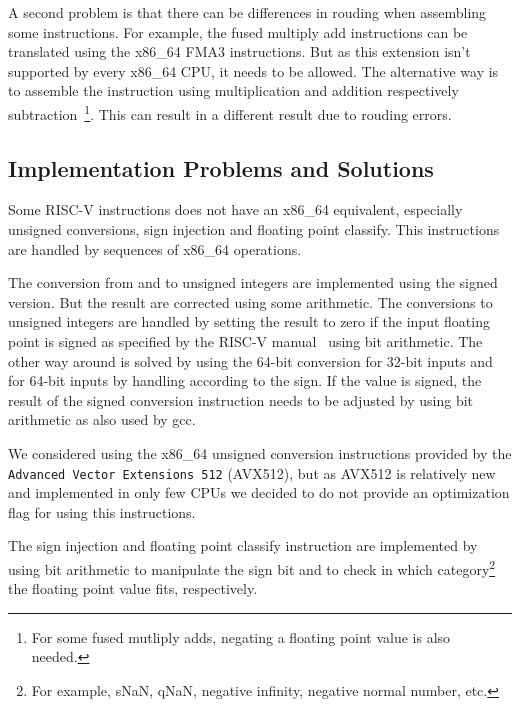 \documentclass[course=eragp]{aspdoc}
\begin{document}
\par


A second problem is that there can be differences in rouding when assembling some instructions. For
example, the fused multiply add instructions can be translated using the x86\_64 FMA3 instructions.
But as this extension isn't supported by every x86\_64 CPU, it needs to be allowed. The alternative
way is to assemble the instruction using multiplication and addition respectively
subtraction~\footnote{For some fused mutliply adds, negating a floating point value is also
    needed.}. This can result in a different result due to rouding errors.


\subsection{Implementation Problems and Solutions}

Some RISC-V instructions does not have an x86\_64 equivalent, especially unsigned conversions, sign
injection and floating point classify. This instructions are handled by sequences of x86\_64
operations.

\par

The conversion from and to unsigned integers are implemented using the signed version. But the
result are corrected using some arithmetic. The conversions to unsigned integers are handled by
setting the result to zero if the input floating point is signed as specified by the RISC-V
manual~\cite{rvspec} using bit arithmetic. The other way around is solved by using the 64-bit
conversion for 32-bit inputs and for 64-bit inputs by handling according to the sign. If the value is
signed, the result of the signed conversion instruction needs to be adjusted by using bit arithmetic
as also used by gcc.

\par

We considered using the x86\_64 unsigned conversion instructions provided by the \texttt{Advanced
    Vector Extensions 512} (AVX512), but as AVX512 is relatively new and implemented in only few CPUs we
decided to do not provide an optimization flag for using this instructions.

\par

The sign injection and floating point classify instruction are implemented by using bit arithmetic
to manipulate the sign bit and to check in which category\footnote{For example, sNaN, qNaN, negative
    infinity, negative normal number, etc.} the floating point value fits, respectively.
\end{document}

